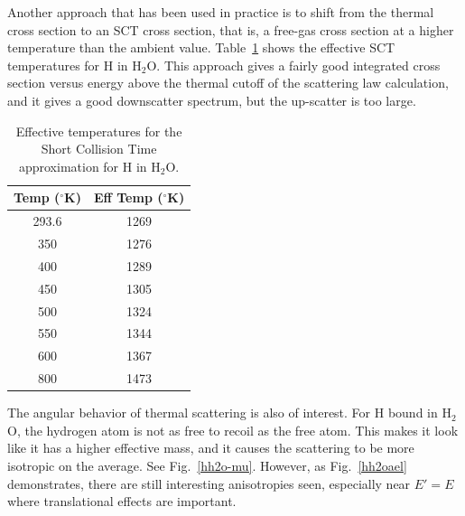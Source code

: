 Another approach that has been used in practice is to shift from the
thermal cross section to an SCT cross section, that is, a free-gas
cross section at a higher temperature than the ambient value.
Table~\ref{efft} shows the effective SCT temperatures for H in H$_2$O.
This approach gives a fairly good integrated cross section versus
energy above the thermal cutoff of the scattering law calculation,
and it gives a good downscatter spectrum, but the up-scatter is too large.

\begin{table}[t]
\begin{center}
\caption[H in H$_2$O SCT effective temperatures]{Effective temperatures
   for the Short Collision Time approximation for H in H$_2$O.}
\label{efft}
\vspace{3mm}
\hspace{-10mm}\begin{tabular}{cc}
\bf\small Temp ($^\circ$K) & \bf\small Eff Temp ($^\circ$K) \\ \hline
293.6 & 1269 \\
350 & 1276 \\
400 & 1289 \\
450 & 1305 \\
500 & 1324 \\
550 & 1344 \\
600 & 1367 \\
800 & 1473 \\ \hline
\end{tabular}
\end{center}
\end{table}

The angular behavior of thermal scattering is also of interest. For
H bound in H$_2$O, the hydrogen atom is not as free to recoil as the
free atom. This makes it look like it has a higher effective mass,
and it causes the scattering to be more isotropic on the average.
See Fig.~\ref{hh2o-mu}.  However, as Fig.~\ref{hh2oael} demonstrates,
there are still interesting anisotropies seen, especially near $E'=E$
where translational effects are important.

